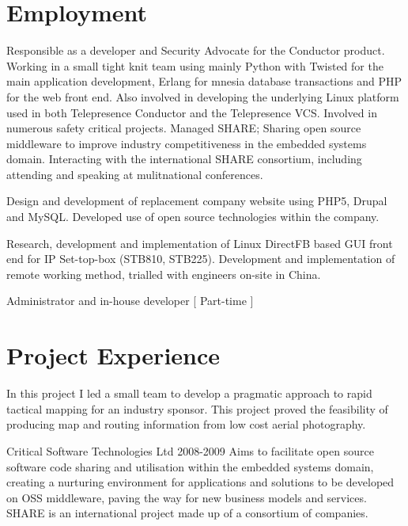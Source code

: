 \documentclass[overlapped,line,letterpaper]{res}
\begin{document}
\begin{resume}
\section{\bf Employment}
{
    Responsible as a developer and Security Advocate for the Conductor product.
    Working in a small tight knit team using mainly Python with Twisted for
    the main application development, Erlang for mnesia database transactions
    and PHP for the web front end.
    Also involved in developing the underlying Linux platform used in both
    Telepresence Conductor and the Telepresence VCS.
}
{
    Involved in numerous safety critical projects. Managed SHARE; 
    Sharing open source middleware to improve industry competitiveness
    in the embedded systems domain. Interacting with the international SHARE 
    consortium, including attending and speaking at mulitnational conferences.
}

{
    Design and development of replacement company website using PHP5, Drupal and
    MySQL.
    Developed use of open source technologies within the company.
}

{
    Research, development and implementation of Linux DirectFB based GUI front end
    for IP Set-top-box (STB810, STB225). Development and implementation of remote
    working method, trialled with engineers on-site in China.
}

{
    Administrator and in-house developer [ Part-time ]
}


\section{\bf Project Experience}
{
    In this project I led a small team to develop a pragmatic approach to rapid
    tactical mapping for an industry sponsor. 
    This project proved the feasibility of producing map and routing information
    from low cost aerial photography.    
}

  {Critical Software Technologies Ltd}
  {2008-2009}
{
    Aims to facilitate open source software code sharing and utilisation within 
    the embedded systems domain, creating a nurturing environment for 
    applications and solutions to be developed on OSS middleware, paving the way
    for new business models and services. 
    SHARE is an international project made up of a consortium of companies.
}


\end{resume}
\end{document}

